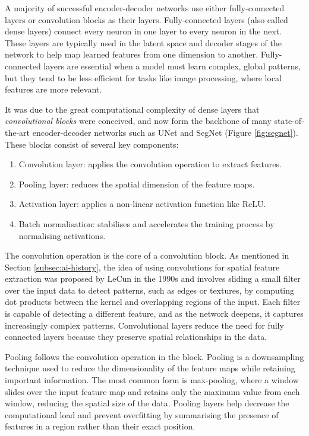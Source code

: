 A majority of successful encoder-decoder networks use either fully-connected layers or convolution blocks as their layers. Fully-connected layers (also called dense layers) connect every neuron in one layer to every neuron in the next. These layers are typically used in the latent space and decoder stages of the network to help map learned features from one dimension to another. Fully-connected layers are essential when a model must learn complex, global patterns, but they tend to be less efficient for tasks like image processing, where local features are more relevant. 

It was due to the great computational complexity of dense layers that \textit{convolutional blocks} were conceived, and now form the backbone of many state-of-the-art encoder-decoder networks such as UNet \cite{ronneberger_u-net_2015} and SegNet \cite{badrinarayanan_segnet_2015} (Figure \ref{fig:segnet}). These blocks consist of several key components: 
\begin{enumerate}
    \item Convolution layer: applies the convolution operation to extract features.
    \item Pooling layer: reduces the spatial dimension of the feature maps.
    \item Activation layer: applies a non-linear activation function like ReLU.
    \item Batch normalisation: stabilises and accelerates the training process by normalising activations.
\end{enumerate}

The convolution operation is the core of a convolution block. As mentioned in Section \ref{subsec:ai-history}, the idea of using convolutions for spatial feature extraction was proposed by LeCun in the 1990s \cite{lecun_convolutional_1995} and involves sliding a small filter over the input data to detect patterns, such as edges or textures, by computing dot products between the kernel and overlapping regions of the input. Each filter is capable of detecting a different feature, and as the network deepens, it captures increasingly complex patterns. Convolutional layers reduce the need for fully connected layers because they preserve spatial relationships in the data.

Pooling follows the convolution operation in the block. Pooling is a downsampling technique used to reduce the dimensionality of the feature maps while retaining important information. The most common form is max-pooling, where a window slides over the input feature map and retains only the maximum value from each window, reducing the spatial size of the data. Pooling layers help decrease the computational load and prevent overfitting by summarising the presence of features in a region rather than their exact position.

